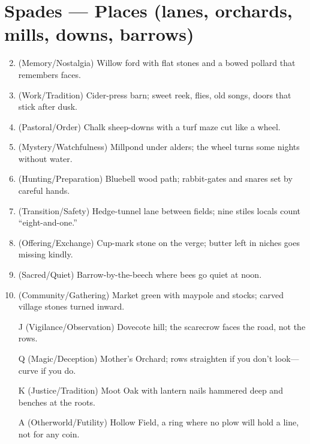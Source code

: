 \section*{Spades --- Places (lanes, orchards, mills, downs, barrows)}
\label{sec:aelaerem-places}
\begin{enumerate}
\setcounter{enumi}{1}
\item (Memory/Nostalgia) Willow ford with flat stones and a bowed pollard that remembers faces.
\item (Work/Tradition) Cider-press barn; sweet reek, flies, old songs, doors that stick after dusk.
\item (Pastoral/Order) Chalk sheep-downs with a turf maze cut like a wheel.
\item (Mystery/Watchfulness) Millpond under alders; the wheel turns some nights without water.
\item (Hunting/Preparation) Bluebell wood path; rabbit-gates and snares set by careful hands.
\item (Transition/Safety) Hedge-tunnel lane between fields; nine stiles locals count ``eight-and-one.''
\item (Offering/Exchange) Cup-mark stone on the verge; butter left in niches goes missing kindly.
\item (Sacred/Quiet) Barrow-by-the-beech where bees go quiet at noon.
\item (Community/Gathering) Market green with maypole and stocks; carved village stones turned inward.
\item[J] (Vigilance/Observation) Dovecote hill; the scarecrow faces the road, not the rows.
\item[Q] (Magic/Deception) Mother's Orchard; rows straighten if you don't look---curve if you do.
\item[K] (Justice/Tradition) Moot Oak with lantern nails hammered deep and benches at the roots.
\item[A] (Otherworld/Futility) Hollow Field, a ring where no plow will hold a line, not for any coin.
\end{enumerate}

